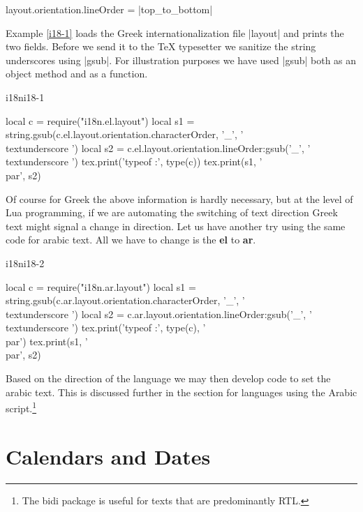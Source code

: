 layout.orientation.lineOrder = |top_to_bottom|

Example \ref{i18-1} loads the Greek internationalization file |layout| and prints the two fields. Before we send it to
the TeX typesetter we sanitize the string underscores using |gsub|. For illustration purposes we have used |gsub| both as an object method and as a function.

\begin{texexample}{i18n}{i18-1}
\begin{luacode}
local c = require("i18n.el.layout")
local s1 = string.gsub(c.el.layout.orientation.characterOrder, '_', '\\textunderscore ')
local s2 = c.el.layout.orientation.lineOrder:gsub('_', '\\textunderscore ')
tex.print('typeof :', type(c))
tex.print(s1, '\\par', s2)
\end{luacode}
\end{texexample}

Of course for Greek the above information is hardly necessary, but at the level of Lua programming, if we are automating the switching of text direction Greek text might signal a change in direction. Let us have another try using the same code for arabic text. All we have to change is the \textbf{el} to \textbf{ar}.

\begin{texexample}{i18n}{i18-2}
\begin{luacode}
local c = require("i18n.ar.layout")
local s1 = string.gsub(c.ar.layout.orientation.characterOrder, '_', '\\textunderscore ')
local s2 = c.ar.layout.orientation.lineOrder:gsub('_', '\\textunderscore ')
tex.print('typeof :', type(c), '\\par')
tex.print(s1, '\\par', s2)
\end{luacode}
\end{texexample}

Based on the direction of the language we may then develop code to set the arabic text. This is discussed further
in the section for languages using the Arabic script.\footnote{The bidi package is useful for texts that are predominantly RTL.}

\section{Calendars and Dates}

